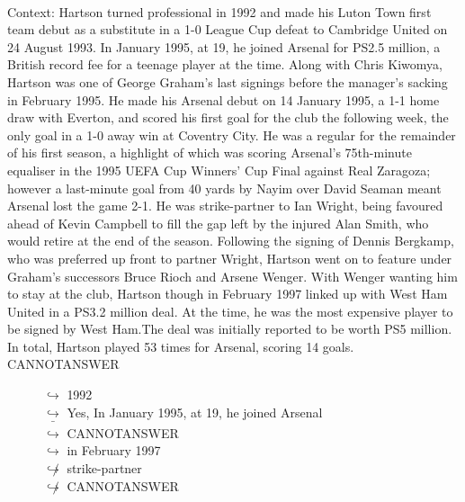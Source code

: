 \documentclass[11pt,a4paper, onecolumn]{article}
\begin{document}
\\ Context: Hartson turned professional in 1992 and made his Luton Town first team debut as a substitute in a 1-0 League Cup defeat to Cambridge United on 24 August 1993. In January 1995, at 19, he joined Arsenal for PS2.5 million, a British record fee for a teenage player at the time. Along with Chris Kiwomya, Hartson was one of George Graham's last signings before the manager's sacking in February 1995. He made his Arsenal debut on 14 January 1995, a 1-1 home draw with Everton, and scored his first goal for the club the following week, the only goal in a 1-0 away win at Coventry City. He was a regular for the remainder of his first season, a highlight of which was scoring Arsenal's 75th-minute equaliser in the 1995 UEFA Cup Winners' Cup Final against Real Zaragoza; however a last-minute goal from 40 yards by Nayim over David Seaman meant Arsenal lost the game 2-1. He was strike-partner to Ian Wright, being favoured ahead of Kevin Campbell to fill the gap left by the injured Alan Smith, who would retire at the end of the season. Following the signing of Dennis Bergkamp, who was preferred up front to partner Wright, Hartson went on to feature under Graham's successors Bruce Rioch and Arsene Wenger. With Wenger wanting him to stay at the club, Hartson though in February 1997 linked up with West Ham United in a PS3.2 million deal. At the time, he was the most expensive player to be signed by West Ham.The deal was initially reported to be worth PS5 million. In total, Hartson played 53 times for Arsenal, scoring 14 goals. CANNOTANSWER

\begin{figure}[t] \small \begin{tcolorbox}[boxsep=0pt,left=5pt,right=0pt,top=2pt,colback = yellow!5] \begin{dialogue}
 \small 
\colorbox{pink!25}{$\hookrightarrow$}
{ 1992 }
\\
\colorbox{pink!25}{$\hookrightarrow$}
\colorbox{red!25}{Yes,}
{ In January 1995, at 19, he joined Arsenal }
\\
\colorbox{pink!25}{ $\bar{\hookrightarrow}$}
{ CANNOTANSWER }
\\
\colorbox{pink!25}{$\hookrightarrow$}
{ in February 1997 }
\\
\colorbox{pink!25}{$\not\hookrightarrow$}
{ strike-partner }
\\
\colorbox{pink!25}{$\not\hookrightarrow$}
{ CANNOTANSWER }
\\
 \end{dialogue}\end{tcolorbox}\end{figure}
\end{document}
